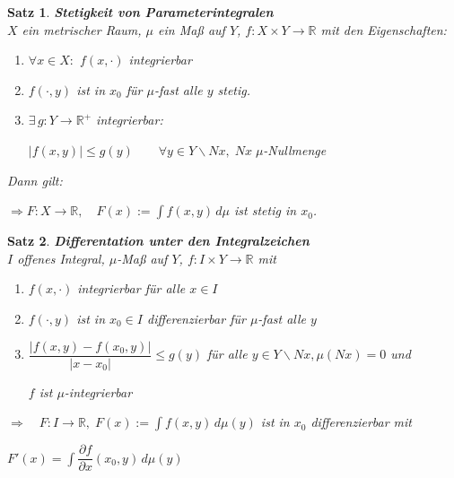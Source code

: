 \documentclass[11pt]{memoir}
\theoremstyle{changebreak}
\newtheorem{Satz}{Satz}[chapter]
\begin{document}


\begin{Satz}
\emph{\textbf{Stetigkeit von Parameterintegralen}} \\
$X$ ein metrischer Raum, $\mu$ ein Maß auf $Y$, $f: X \times Y \rightarrow \mathbb R$ mit den Eigenschaften:
\begin{enumerate}
	\item $\forall x \in X:$ $f(x, \cdotp)$ integrierbar
	\item $f(\cdotp, y)$ ist in $x_0$ für $\mu$-fast alle $y$ stetig.
	\item $\exists\, g: Y \rightarrow \mathbb R^+$ integrierbar: 
		\begin{center}
			$|f(x, y)| \leq g(y)\qquad \forall y \in Y \backslash Nx, \;Nx \;\mu$-Nullmenge
		\end{center}
\end{enumerate}
Dann gilt:
\begin{center}
	$\Rightarrow F: X \rightarrow \mathbb R, \quad F(x):= \int f(x, y) \,d\mu$ \quad ist stetig in $x_0$.
\end{center}
\end{Satz}

\begin{Satz}
\emph{\textbf{Differentation unter den Integralzeichen}} \\
$I$ offenes Integral, $\mu$-Maß auf $Y$, $f: I \times Y \rightarrow \mathbb R$ mit
\begin{enumerate}
	\item $f(x, \cdotp)$ integrierbar für alle $x \in I$
	\item $f(\cdotp, y)$ ist in $x_0 \in I$ differenzierbar für $\mu$-fast alle $y$
	\item $\dfrac{|f(x, y) - f(x_0, y)|}{|x - x_0|} \leq g(y)$ für alle $y \in Y \backslash Nx, \mu(Nx)= 0$ und
	\par
	 $f$ ist $\mu$-integrierbar \\
\end{enumerate}
$\Rightarrow \quad F: I \rightarrow \mathbb R, \;F(x):= \int f(x, y)\, d\mu(y)$ ist in $x_0$ differenzierbar mit 
\begin{center}
	$ F'(x) = \int \dfrac{\partial f}{\partial x}(x_0, y) \,d\mu(y)$
\end{center}
\end{Satz}
\end{document}
